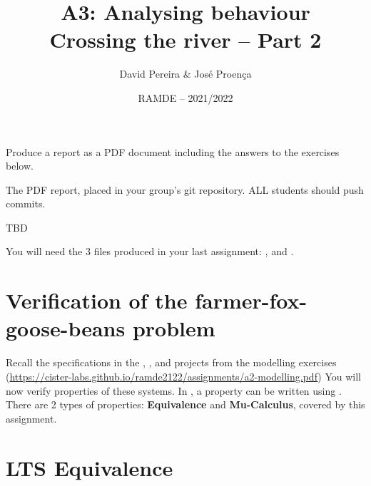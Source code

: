 \documentclass[11pt]{article}
\date{RAMDE -- 2021/2022}
\begin{document}
 
 
\title{A3: Analysing behaviour\\
{\Large Crossing the river -- Part 2}}

\author{David Pereira \& Jos\'{e} Proen\c{c}a} 


\maketitle

 Produce a report as a PDF document including the answers to the exercises below.

 The PDF report, placed in your group's git repository. ALL students should push commits.

 TBD %

 You will need the 3 files produced in your last assignment: ,  and .


\section*{Verification of the farmer-fox-goose-beans problem}

Recall the specifications in the , , and  projects from the modelling exercises (\url{https://cister-labs.github.io/ramde2122/assignments/a2-modelling.pdf})
You will now verify properties of these systems.
In , a property can be written using .
There are 2 types of properties: \textbf{Equivalence} and \textbf{Mu-Calculus}, covered by this assignment.

\section*{LTS Equivalence}
\end{document}
